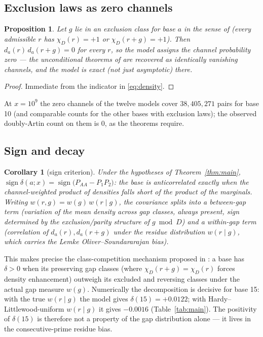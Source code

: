 \documentclass[11pt,reqno]{amsart}
\theoremstyle{plain}
\newtheorem{proposition}[theorem]{Proposition}
\newtheorem{corollary}[theorem]{Corollary}
\theoremstyle{definition}
\newcommand{\dA}{d_a}
\begin{document}
\subsection{Exclusion laws as zero channels}

\begin{proposition}\label{prop:excl}
Let $g$ lie in an exclusion class for base $a$ in the sense of
\cite{BaldII} (every admissible $r$ has $\chi_D(r) = +1$ or
$\chi_D(r+g) = +1$). Then $\dA(r)\, \dA(r+g) = 0$ for every $r$, so the
model assigns the channel probability zero --- the unconditional theorems of
\cite{BaldI, BaldII} are recovered as identically vanishing channels, and
the model is exact (not just asymptotic) there.
\end{proposition}

\begin{proof}
Immediate from the indicator in \eqref{eq:density}.
\end{proof}

At $x = 10^9$ the zero channels of the twelve models cover
$38{,}405{,}271$ pairs for base 10 (and comparable counts for the other
bases with exclusion laws); the observed doubly-Artin count on them is $0$,
as the theorems require.

\subsection{Sign and decay}

\begin{corollary}[sign criterion]\label{cor:sign}
Under the hypotheses of Theorem~\ref{thm:main},
$\operatorname{sign} \delta(a; x) =
\operatorname{sign}\bigl(P_{AA} - P_1 P_2\bigr)$: the base is
anticorrelated exactly when the channel-weighted product of densities falls
short of the product of the marginals. Writing $w(r, g) = w(g)\, w(r \mid g)$,
the covariance splits into a between-gap term (variation of the mean density
across gap classes, always present, sign determined by the exclusion/parity
structure of $g \bmod D$) and a within-gap term (correlation of
$\dA(r), \dA(r{+}g)$ under the residue distribution $w(r \mid g)$, which
carries the Lemke Oliver--Soundararajan bias).
\end{corollary}

This makes precise the class-competition mechanism proposed in
\cite{BaldIV, BaldV}: a base has $\delta > 0$ when its preserving gap
classes (where $\chi_D(r+g) = \chi_D(r)$ forces density enhancement) outweigh
its excluded and reversing classes under the actual gap measure $w(g)$.
Numerically the decomposition is decisive for base 15: with the true
$w(r \mid g)$ the model gives $\delta(15) = +0.0122$; with
Hardy--Littlewood-uniform $w(r \mid g)$ it gives $-0.0016$
(Table~\ref{tab:main}). The positivity of $\delta(15)$ is therefore not a
property of the gap distribution alone --- it lives in the consecutive-prime
residue bias.
\end{document}
